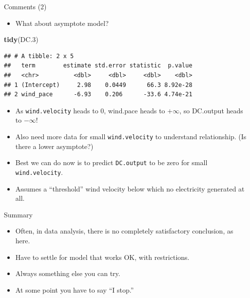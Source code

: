 \documentclass[ignorenonframetext,]{beamer}
\newenvironment{Shaded}{\begin{snugshade}}{\end{snugshade}}
\newcommand{\FloatTok}[1]{\textcolor[rgb]{0.00,0.00,0.81}{#1}}
\newcommand{\KeywordTok}[1]{\textcolor[rgb]{0.13,0.29,0.53}{\textbf{#1}}}
\newcommand{\NormalTok}[1]{#1}
\providecommand{\tightlist}{%
  \setlength{\itemsep}{0pt}\setlength{\parskip}{0pt}}
\begin{document}
\begin{frame}[fragile]{Comments (2)}
\protect\hypertarget{comments-2-1}{}

\begin{itemize}
\tightlist
\item
  What about asymptote model?
\end{itemize}

\begin{Shaded}
\begin{Highlighting}[]
\KeywordTok{tidy}\NormalTok{(DC}\FloatTok{.3}\NormalTok{)}
\end{Highlighting}
\end{Shaded}

\begin{verbatim}
## # A tibble: 2 x 5
##   term        estimate std.error statistic  p.value
##   <chr>          <dbl>     <dbl>     <dbl>    <dbl>
## 1 (Intercept)     2.98    0.0449      66.3 8.92e-28
## 2 wind_pace      -6.93    0.206      -33.6 4.74e-21
\end{verbatim}

\begin{itemize}
\tightlist
\item
  As \texttt{wind.velocity} heads to 0, wind.pace heads to \(+\infty\),
  so DC.output heads to \(−\infty\)!
\item
  Also need more data for small \texttt{wind.velocity} to understand
  relationship. (Is there a lower asymptote?)
\item
  Best we can do now is to predict \texttt{DC.output} to be zero for
  small \texttt{wind.velocity}.
\item
  Assumes a ``threshold'' wind velocity below which no electricity
  generated at all.
\end{itemize}

\end{frame}

\begin{frame}{Summary}
\protect\hypertarget{summary}{}

\begin{itemize}
\tightlist
\item
  Often, in data analysis, there is no completely satisfactory
  conclusion, as here.
\item
  Have to settle for model that works OK, with restrictions.
\item
  Always something else you can try.
\item
  At some point you have to say ``I stop.''
\end{itemize}

\end{frame}
\end{document}
